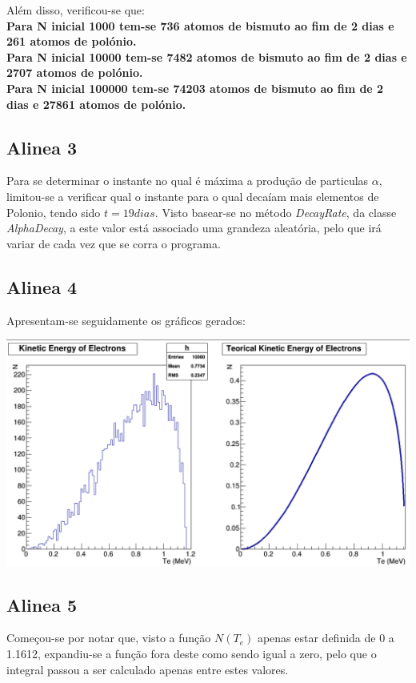 \documentclass{article}
\begin{document}
\begin{multicols}{2}
  Além disso, verificou-se que:\\
 \textbf{ Para N inicial 1000 tem-se 736 atomos de bismuto ao fim de 2 dias e 261 atomos de polónio.\\
Para N inicial 10000 tem-se 7482 atomos de bismuto ao fim de 2 dias e 2707 atomos de polónio.\\
Para N inicial 100000 tem-se 74203 atomos de bismuto ao fim de 2 dias e 27861 atomos de polónio.}


  \subsection{Alinea 3}

  Para se determinar o instante no qual é máxima a produção de particulas $\alpha$, limitou-se a verificar qual o instante para o qual decaíam mais elementos de Polonio, tendo sido $t = 19 dias$. Visto basear-se no método \textit{DecayRate}, da classe \textit{AlphaDecay}, a este valor está associado uma grandeza aleatória, pelo que irá variar de cada vez que se corra o programa.
  
  \subsection{Alinea 4}
  Apresentam-se seguidamente os gráficos gerados:
\begin{center}
    \includegraphics[scale=0.2]{eletro.png}
  \end{center}
  \subsection{Alinea 5}

  Começou-se por notar que, visto a função $N(T_e)$ apenas estar definida de 0 a 1.1612, expandiu-se a função fora deste como sendo igual a zero, pelo que o integral passou a ser calculado apenas entre estes valores.


\end{multicols}
\end{document}
